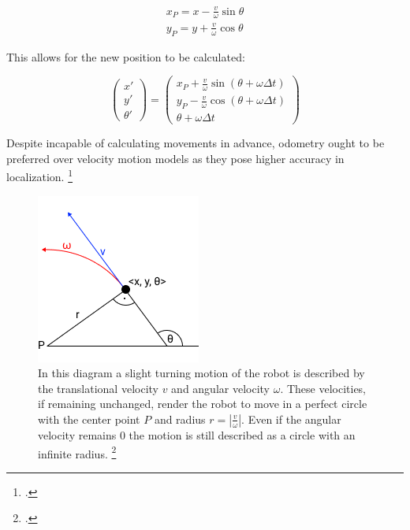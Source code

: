 \begin{equation}
	\begin{split}
		x_{P} = x - \frac{v}{\omega} \sin \theta \\
		y_{P} = y + \frac{v}{\omega} \cos \theta
	\end{split}
\end{equation}

This allows for the new position to be calculated: 

\begin{equation}
	\begin{pmatrix}
		x' \\
		y' \\
		\theta'
	\end{pmatrix}
	=
	\begin{pmatrix}
		x_{P} + \frac{v}{\omega} \sin(\theta + \omega \Delta t) \\
		y_{P} - \frac{v}{\omega} \cos(\theta + \omega \Delta t) \\
		\theta + \omega \Delta t
	\end{pmatrix}
\end{equation}

Despite incapable of calculating movements in advance, odometry ought to be preferred over velocity motion models as they pose higher accuracy in localization. \footcite[Page 107]{thrun2002probabilisticRobotics}

\begin{figure}
	\centering
	\includegraphics[width=0.5\linewidth]{img/inertial}
	\caption{
		In this diagram a slight turning motion of the robot is described by the translational velocity $v$ and angular velocity $\omega$. These velocities, if remaining unchanged, render the robot to move in a perfect circle with the center point $P$ and radius $r = | \frac{v}{\omega}|$. Even if the angular velocity remains 0 the motion is still described as a circle with an infinite radius. \footcite[Pages 95 - 107]{thrun2002probabilisticRobotics}
	}
	\label{fig:inertial}
\end{figure}



